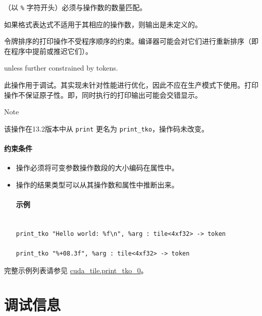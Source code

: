 \documentclass{article}
\begin{document}
（以 \texttt{\%} 字符开头）必须与操作数的数量匹配。

如果格式表达式不适用于其相应的操作数，则输出是未定义的。



令牌排序的打印操作不受程序顺序的约束。编译器可能会对它们进行重新排序（即在程序中提前或推迟它们）。

unless further constrained by tokens.




此操作用于调试。其实现未针对性能进行优化，因此不应在生产模式下使用。打印操作不保证原子性。即，同时执行的打印输出可能会交错显示。



Note




该操作在13.2版本中从 \texttt{print} 更名为 \texttt{print\_tko}，操作码未改变。





\paragraph{约束条件}


\begin{itemize}
\item 操作必须将可变参数操作数段的大小编码在属性中。
\item 操作的结果类型可以从其操作数和属性中推断出来。




\paragraph{示例}


\begin{lstlisting}

print_tko "Hello world: %f\n", %arg : tile<4xf32> -> token

print_tko "%+08.3f", %arg : tile<4xf32> -> token

\end{lstlisting}



\end{itemize}
完整示例列表请参见 \href{https://docs.nvidia.com/cuda/tile-ir/latest/sections/appendix.html#example-cuda-tile-print-tko-0}{cuda\_tile.print\_tko\_0}。


\newpage
\section{调试信息}
\end{document}
